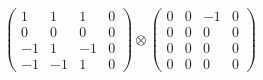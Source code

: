 \documentclass{article}
\begin{document}
{\begin{align}
            \begin{pmatrix} 1 & 1 & 1 & 0 \\ 0 & 0 & 0 & 0 \\ -1 & 1 & -1 & 0 \\ -1 & -1 & 1 & 0 \end{pmatrix} \otimes 
            \begin{pmatrix} 0 & 0 & -1 & 0 \\ 0 & 0 & 0 & 0 \\ 0 & 0 & 0 & 0 \\ 0 & 0 & 0 & 0 \end{pmatrix} 
        \end{align}
        }
        
        
        \begin{landscape}
        \resizebox{\columnwidth}{!}{
        \begin{tikzpicture}[node distance=3cm and 1cm, auto]
        

\end{tikzpicture}}
\end{landscape}
\end{document}
